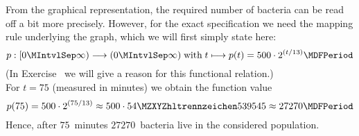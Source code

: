 \begin{MIntro}
\begin{MExample}
\begin{center}
\end{center}

From the graphical representation, the required number of bacteria can be read off a bit more precisely. However, 
for the exact specification we need the mapping rule underlying the graph, which we will first simply state here:
$$p: [0\MIntvlSep \infty) \longrightarrow (0\MIntvlSep  \infty) \;\text{with}\; t \longmapsto p(t) = 500 \cdot 2^{(t/13)} \MDFPeriod$$
(In Exercise~ we will give a reason for this functional relation.)\\
For $t = 75$ (measured in minutes) we obtain the function value
$$p(75) = 500 \cdot 2^{(75/13)} \approx 500 \cdot \MZahl{54}{539545} \approx 27270 \MDFPeriod$$
Hence, after $75$~minutes $27270$~bacteria live in the considered population.
\end{MExample}
\end{MIntro}



